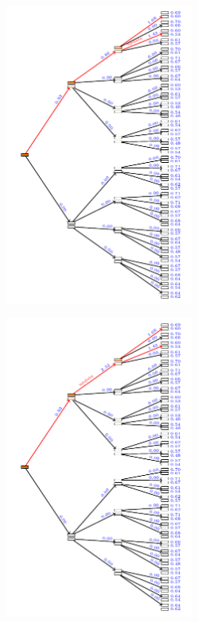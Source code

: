 \documentclass[aspectratio=169]{beamer}
\begin{document}
\begin{landscape}
    \begin{frame}
        \begin{figure}
            \includegraphics[width=0.55\textwidth]{trees/1/tex_tree_4.pdf}
        \end{figure}
    \end{frame}
\end{landscape}

\begin{landscape}
    \begin{frame}
        \begin{figure}
            \includegraphics[width=0.55\textwidth]{trees/1/tex_tree_5.pdf}
        \end{figure}
    \end{frame}
\end{landscape}
\end{document}
